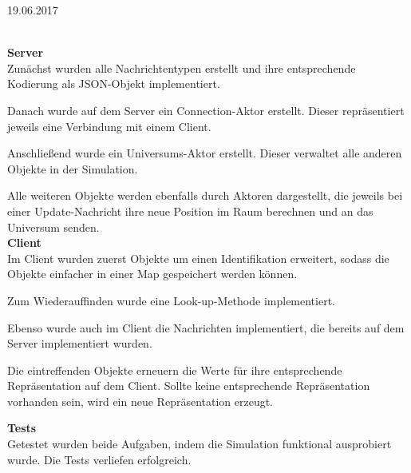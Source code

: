 \documentclass{rp}
\begin{document}


{19.06.2017} %

%
\\
\textbf{Server}\\
Zunächst wurden alle Nachrichtentypen erstellt und ihre entsprechende Kodierung als JSON-Objekt implementiert.

Danach wurde auf dem Server ein Connection-Aktor erstellt. Dieser repräsentiert jeweils eine Verbindung mit einem Client. 

Anschließend wurde ein Universums-Aktor erstellt. Dieser verwaltet alle anderen Objekte in der Simulation. 

Alle weiteren Objekte werden ebenfalls durch Aktoren dargestellt, die jeweils bei einer Update-Nachricht ihre neue Position im Raum berechnen und an das Universum senden. 
\\
\textbf{Client}\\
Im Client wurden zuerst Objekte um einen Identifikation erweitert, sodass die Objekte einfacher in einer Map gespeichert werden können. 

Zum Wiederauffinden wurde eine Look-up-Methode implementiert.

Ebenso wurde auch im Client die Nachrichten implementiert, die bereits auf dem Server implementiert wurden. 

Die eintreffenden Objekte erneuern die Werte für ihre entsprechende Repräsentation auf dem Client. Sollte keine entsprechende Repräsentation vorhanden sein, wird ein neue Repräsentation erzeugt. 


\textbf{Tests}\\
Getestet wurden beide Aufgaben, indem die Simulation funktional ausprobiert wurde. Die Tests verliefen erfolgreich.
\end{document}
